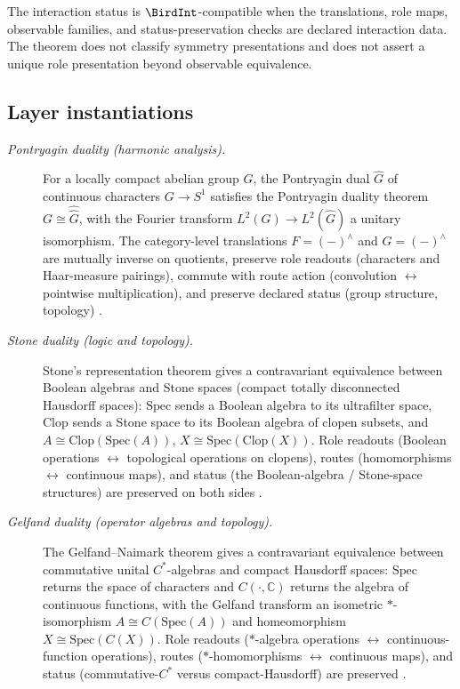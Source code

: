 \documentclass[11pt]{article}
\theoremstyle{definition}
\begin{document}
The interaction status is \(\BirdInt\)-compatible when the
translations, role maps, observable families, and status-preservation
checks are declared interaction data.  The theorem does not classify
symmetry presentations and does not assert a unique role presentation
beyond observable equivalence.

\subsection*{Layer instantiations}\label{layer-inst:F41}

\begin{description}
\item[\emph{Pontryagin duality (harmonic analysis).}]
For a locally compact abelian group \(G\), the Pontryagin dual
\(\widehat G\) of continuous characters \(G\to S^1\) satisfies the
Pontryagin duality theorem
\(G\cong\widehat{\widehat G}\), with the Fourier transform
\(L^2(G)\to L^2(\widehat G)\) a unitary isomorphism.  The
category-level translations \(F=(-)^\wedge\) and \(G=(-)^\wedge\)
are mutually inverse on quotients, preserve role readouts
(characters and Haar-measure pairings), commute with route action
(convolution \(\leftrightarrow\) pointwise multiplication), and
preserve declared status (group structure, topology)
\citep{Pontryagin1966TopologicalGroups}.

\item[\emph{Stone duality (logic and topology).}]
Stone's representation theorem gives a contravariant equivalence
between Boolean algebras and Stone spaces (compact totally
disconnected Hausdorff spaces): \(\mathrm{Spec}\) sends a Boolean
algebra to its ultrafilter space, \(\mathrm{Clop}\) sends a Stone
space to its Boolean algebra of clopen subsets, and
\(A\cong\mathrm{Clop}(\mathrm{Spec}(A))\),
\(X\cong\mathrm{Spec}(\mathrm{Clop}(X))\).  Role readouts (Boolean
operations \(\leftrightarrow\) topological operations on clopens),
routes (homomorphisms \(\leftrightarrow\) continuous maps), and
status (the Boolean-algebra / Stone-space structures) are
preserved on both sides
\citep{Stone1936RepresentationsBooleanAlgebras}.

\item[\emph{Gelfand duality (operator algebras and topology).}]
The Gelfand--Naimark theorem gives a contravariant equivalence
between commutative unital \(C^*\)-algebras and compact Hausdorff
spaces: \(\mathrm{Spec}\) returns the space of characters and
\(C(\cdot,\mathbb C)\) returns the algebra of continuous functions,
with the Gelfand transform an isometric \(*\)-isomorphism
\(A\cong C(\mathrm{Spec}(A))\) and homeomorphism
\(X\cong\mathrm{Spec}(C(X))\).  Role readouts (\(*\)-algebra
operations \(\leftrightarrow\) continuous-function operations),
routes (\(*\)-homomorphisms \(\leftrightarrow\) continuous maps),
and status (commutative-\(C^*\) versus compact-Hausdorff) are
preserved
\citep{GelfandNaimark1943NormedRings}.


\end{description}
\end{document}
